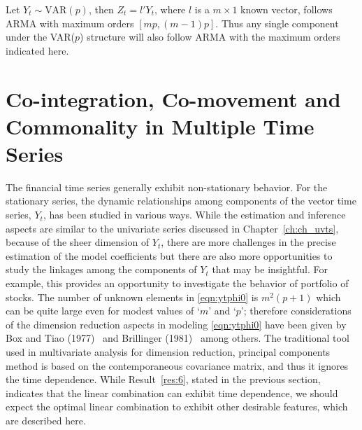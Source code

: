\begin{result} \label{res:6} 
Let $Y_t \sim \text{VAR}(p)$, then $Z_t= l' Y_t$, where $l$ is a $m \times 1$ known vector, follows ARMA with maximum orders $[mp, (m-1)p]$. Thus any single component under the VAR($p$) structure will also follow ARMA with the maximum orders indicated here. \label{in:mts2}
\end{result}



\section{Co-integration, Co-movement and Commonality in Multiple Time Series \label{sec:comts}}\label{in:coint1}\label{in:comove1}


The financial time series generally exhibit non-stationary behavior. For the stationary series, the dynamic relationships among components of the vector time series, $Y_t$, has been studied in various ways. While the estimation and inference aspects are similar to the univariate series discussed in Chapter~\ref{ch:ch_uvts}, because of the sheer dimension of $Y_t$, there are more challenges in the precise estimation of the model coefficients but there are also more opportunities to study the linkages among the components of $Y_t$ that may be insightful. For example, this provides an opportunity to investigate the behavior of portfolio of stocks. The number of unknown elements in \eqref{eqn:ytphi0} is $m^2 (p+1)$ which can be quite large even for modest values of `$m$' and `$p$'; therefore considerations of the dimension reduction aspects in modeling \eqref{eqn:ytphi0} have been given by Box and Tiao (1977)~\cite{box77} and Brillinger (1981)~\cite{brill81} among others. The traditional tool used in multivariate analysis for dimension reduction, principal components method is based on the contemporaneous covariance matrix, and thus it ignores the time dependence. While Result~\ref{res:6}, stated in the previous section, indicates that the linear combination can exhibit time dependence, we should expect the optimal linear combination to exhibit other desirable features, which are described here. 


